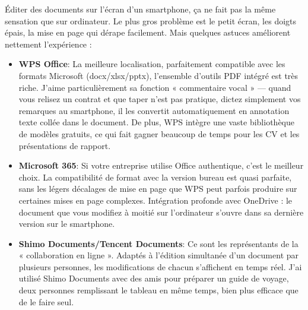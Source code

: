


Éditer des documents sur l'écran d'un smartphone, ça ne fait pas la même sensation que sur ordinateur. Le plus gros problème est le petit écran, les doigts épais, la mise en page qui dérape facilement. Mais quelques astuces améliorent nettement l'expérience :

\begin{itemize}
  \item \textbf{WPS Office}: La meilleure localisation, parfaitement compatible avec les formats Microsoft (docx/xlsx/pptx), l'ensemble d'outils PDF intégré est très riche. J'aime particulièrement sa fonction « commentaire vocal » — quand vous relisez un contrat et que taper n'est pas pratique, dictez simplement vos remarques au smartphone, il les convertit automatiquement en annotation texte collée dans le document. De plus, WPS intègre une vaste bibliothèque de modèles gratuits, ce qui fait gagner beaucoup de temps pour les CV et les présentations de rapport.
  \item \textbf{Microsoft 365}: Si votre entreprise utilise Office authentique, c'est le meilleur choix. La compatibilité de format avec la version bureau est quasi parfaite, sans les légers décalages de mise en page que WPS peut parfois produire sur certaines mises en page complexes. Intégration profonde avec OneDrive : le document que vous modifiez à moitié sur l'ordinateur s'ouvre dans sa dernière version sur le smartphone.
  \item \textbf{Shimo Documents/Tencent Documents}: Ce sont les représentants de la « collaboration en ligne ». Adaptés à l'édition simultanée d'un document par plusieurs personnes, les modifications de chacun s'affichent en temps réel. J'ai utilisé Shimo Documents avec des amis pour préparer un guide de voyage, deux personnes remplissant le tableau en même temps, bien plus efficace que de le faire seul.
\end{itemize}

